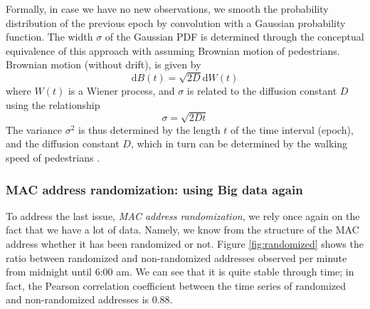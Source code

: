 \documentclass[10pt,a4paper]{article}
\begin{document}
Formally, in case we have no new observations, we smooth the probability distribution of the previous epoch by convolution with a Gaussian probability function. The width $\sigma$ of the Gaussian PDF is determined through the conceptual equivalence of this approach with assuming Brownian motion of pedestrians. Brownian motion (without drift), is given by
\begin{equation}
\text{d}B(t)=\sqrt{2D}\text{d}W(t)
\end{equation}
where $W(t)$ is a Wiener process, and $\sigma$ is related to the diffusion constant $D$ using the relationship
\begin{equation}
\sigma=\sqrt{2Dt}
\end{equation}
The variance $\sigma^2$ is thus determined by the length $t$ of the time interval (epoch), and the diffusion constant $D$, which in turn can be determined by the walking speed of pedestrians \cite{ebeling}.\\




\subsubsection{MAC address randomization: using Big data again}

To address the last issue, {\it MAC address randomization}, we rely once again on the fact that we have a lot of data. Namely, we know from the structure of the MAC address whether it has been randomized or not. Figure \ref{fig:randomized} shows the ratio between randomized and non-randomized addresses observed per minute from midnight until 6:00 am. We can see that it is quite stable through time; in fact, the Pearson correlation coefficient between the time series of randomized and non-randomized addresses is 0.88. 
\end{document}
